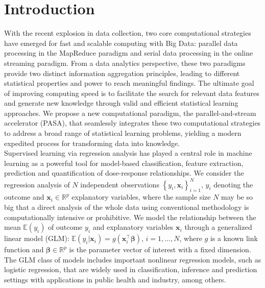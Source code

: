 \documentclass[12pt]{article}
\newcommand{\bx}{\boldsymbol{x}}
\newcommand{\bbeta}{\boldsymbol{\beta}}
\begin{document}
\vfill

\newpage

\section{Introduction}
With the recent explosion in data collection, two core computational strategies have emerged for fast and scalable computing with Big Data: parallel data processing in the MapReduce paradigm and serial data processing in the online streaming paradigm. From a data analytics perspective, these two paradigms provide two distinct information aggregation principles, leading to different statistical properties and power to reach meaningful findings. The ultimate goal of improving computing speed is to facilitate the search for relevant data features and generate new knowledge through valid and efficient statistical learning approaches. We propose a new computational paradigm, the parallel-and-stream accelerator (PASA), that seamlessly integrates these two computational strategies to address a broad range of statistical learning problems, yielding a modern expedited process for transforming data into knowledge.\\
Supervised learning via regression analysis has played a central role in machine learning as a powerful tool for model-based classification, feature extraction, prediction and quantification of dose-response relationships. We consider the regression analysis of $N$ independent observations $\left\{ y_i, \bx_i \right\}_{i=1}^N$, $y_i$ denoting the outcome and $\bx_i \in \mathbb{R}^p$ explanatory variables, where the sample size $N$ may be so big that a direct analysis of the whole data using conventional methodology is computationally intensive or prohibitive. We model the relationship between the mean $\mathbb{E}(y_i)$ of outcome $y_i$ and explanatory variables $\bx_i$ through a generalized linear model (GLM): $\mathbb{E}(y_i\rvert \bx_i)=g(\bx^\top_i \bbeta)$, $i=1, \ldots, N$, where $g$ is a known link function and $\bbeta \in \mathbb{R}^p$ is the parameter vector of interest with a fixed dimension. The GLM class of models includes important nonlinear regression models, such as logistic regression, that are widely used in classification, inference and prediction settings with applications in public health and industry, among others.
\end{document}
